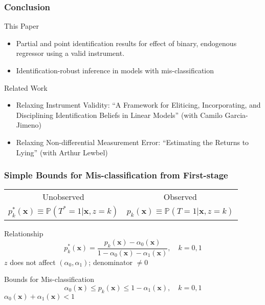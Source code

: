 \documentclass[handout]{beamer}
\begin{document}
\begin{frame}
  \frametitle{Conclusion}

  \small

  \begin{block}{This Paper}
    \begin{itemize}
      \item Partial and point identification results for effect of binary, endogenous regressor using a valid instrument.
      \item Identification-robust inference in models with mis-classification
    \end{itemize}
\end{block}

\begin{block}{Related Work}
  \begin{itemize}
  \item Relaxing Instrument Validity: ``A Framework for Eliticing, Incorporating, and Disciplining Identification Beliefs in Linear Models'' (with Camilo Garcia-Jimeno) 
    \item Relaxing Non-differential Measurement Error: ``Estimating the Returns to Lying'' (with Arthur Lewbel)
  \end{itemize}
\end{block}


\end{frame}
\appendix
\begin{frame}[label=BOUNDS_APPEND]
  \frametitle{Simple Bounds for Mis-classification from First-stage} 

  \begin{table}[h]
    \centering
  \begin{tabular}[h]{|c|c|}
    \hline
   Unobserved & Observed \\
    $p^*_k(\mathbf{x}) \equiv \mathbb{P}(T^*=1|\mathbf{x}, z=k)$ & 
    $p_k(\mathbf{x}) \equiv \mathbb{P}(T=1|\mathbf{x}, z=k)$\\
    \hline
  \end{tabular}
\end{table}


  \begin{block}{Relationship}
    \vspace{-1em}
   \[
     p_k^*(\mathbf{x}) = \frac{p_k(\mathbf{x}) - \alpha_0(\mathbf{x})}{1 - \alpha_0(\mathbf{x}) - \alpha_1(\mathbf{x})}, \quad k = 0,1
   \]
   \hfill\alert{\footnotesize $z$ does not affect $(\alpha_0, \alpha_1)$; denominator $\neq 0$}
  \end{block}

  \normalsize
  \begin{block}{Bounds for Mis-classification}
    \vspace{-1em}
    \[
      \alpha_0(\mathbf{x}) \leq p_k(\mathbf{x}) \leq 1 - \alpha_1(\mathbf{x}), \quad k = 0,1
    \]
   \hfill \alert{\footnotesize$\alpha_0(\mathbf{x}) + \alpha_1(\mathbf{x}) <1$}
  \end{block}
    \hyperlink{BOUNDS_BODY}{}
\end{frame}
\end{document}
